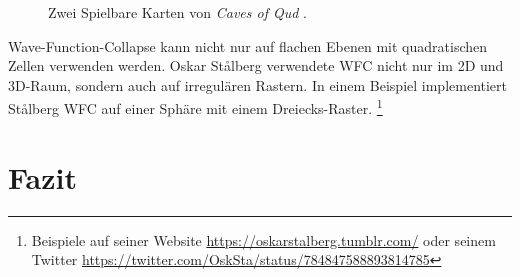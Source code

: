 \documentclass[12pt, a4paper,twoside,openright]{report} %
\begin{document}
\begin{figure}[H]
    \centering
    \caption{Zwei Spielbare Karten von \textit{Caves of Qud} \cite{Karth2017WaveFunctionCollapseIC}.}%
\end{figure}

Wave-Function-Collapse kann nicht nur auf flachen Ebenen mit quadratischen Zellen verwenden werden.
Oskar Stålberg verwendete WFC nicht nur im 2D und 3D-Raum, sondern auch auf irregulären Rastern.
In einem Beispiel implementiert Stålberg WFC auf einer Sphäre mit einem Dreiecks-Raster.
\footnote[7]{Beispiele auf seiner Website
\url{https://oskarstalberg.tumblr.com/}
oder seinem Twitter
\url{https://twitter.com/OskSta/status/784847588893814785}}

\chapter{Fazit}
\end{document}

